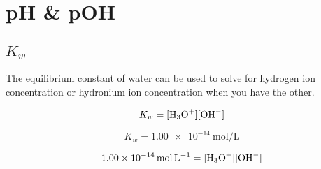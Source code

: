 \documentclass[a4paper,12pt]{article}
\begin{document}
\section{pH \& pOH}
\subsection{$K_w$}
The equilibrium constant of water can be used to solve for hydrogen ion concentration or hydronium ion concentration when you have the other.

$$K_w = [\ce{H3O+}][\ce{OH-}]$$

$$K_w = \SI{1.00e-14}{\mol\per\L}$$

$$\SI{1.00e-14}{\mol\per\L} = [\ce{H3O+}][\ce{OH-}]$$
\end{document}
